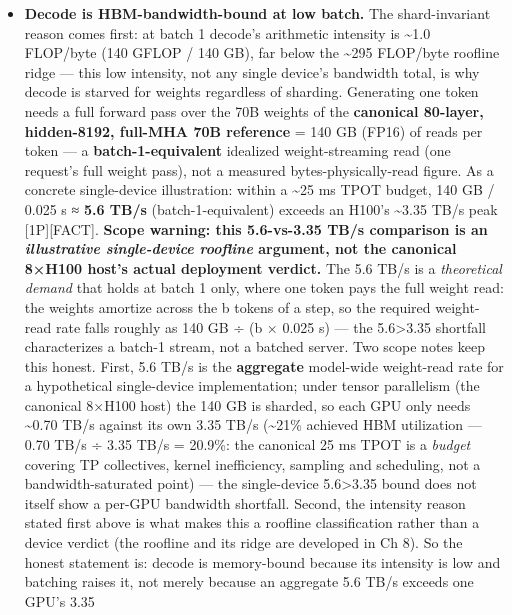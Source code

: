 \begin{itemize}
\item
  \textbf{Decode is HBM-bandwidth-bound at low batch.} The
  shard-invariant reason comes first: at batch 1 decode's arithmetic
  intensity is \textasciitilde1.0 FLOP/byte (140 GFLOP / 140 GB), far
  below the \textasciitilde295 FLOP/byte roofline ridge --- this low
  intensity, not any single device's bandwidth total, is why decode is
  starved for weights regardless of sharding. Generating one token needs
  a full forward pass over the 70B weights of the \textbf{canonical
  80-layer, hidden-8192, full-MHA 70B reference} = 140 GB (FP16) of
  reads per token --- a \textbf{batch-1-equivalent} idealized
  weight-streaming read (one request's full weight pass), not a measured
  bytes-physically-read figure. As a concrete single-device
  illustration: within a \textasciitilde25 ms TPOT budget, 140 GB /
  0.025 s ≈ \textbf{5.6 TB/s} (batch-1-equivalent) exceeds an H100's
  \textasciitilde3.35 TB/s peak \mbox{{[}1P{]}}\hspace{0pt}\mbox{{[}FACT{]}}. \textbf{Scope
  warning: this 5.6-vs-3.35 TB/s comparison is an \emph{illustrative
  single-device roofline} argument, not the canonical 8×H100 host's
  actual deployment verdict.} The 5.6 TB/s is a \emph{theoretical
  demand} that holds at batch 1 only, where one token pays the full
  weight read: the weights amortize across the b tokens of a step, so
  the required weight-read rate falls roughly as 140 GB ÷ (b × 0.025 s)
  --- the 5.6\textgreater3.35 shortfall characterizes a batch-1 stream,
  not a batched server. Two scope notes keep this honest. First, 5.6
  TB/s is the \textbf{aggregate} model-wide weight-read rate for a
  hypothetical single-device implementation; under tensor parallelism
  (the canonical 8×H100 host) the 140 GB is sharded, so each GPU only
  needs \textasciitilde0.70 TB/s against its own 3.35 TB/s
  (\textasciitilde21\% achieved HBM utilization --- 0.70 TB/s ÷ 3.35
  TB/s = 20.9\%: the canonical 25 ms TPOT is a \emph{budget} covering TP
  collectives, kernel inefficiency, sampling and scheduling, not a
  bandwidth-saturated point) --- the single-device 5.6\textgreater3.35
  bound does not itself show a per-GPU bandwidth shortfall. Second, the
  intensity reason stated first above is what makes this a roofline
  classification rather than a device verdict (the roofline and its
  ridge are developed in Ch 8). So the honest statement is: decode is
  memory-bound because its intensity is low and batching raises it, not
  merely because an aggregate 5.6 TB/s exceeds one GPU's 3.35

\end{itemize}
